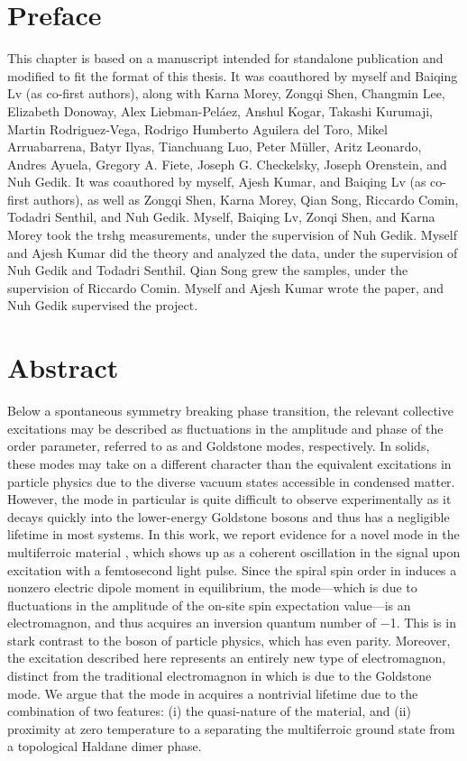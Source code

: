 \section{Preface}

This chapter is based on a manuscript intended for standalone publication and modified to fit the format of this thesis.
It was coauthored by myself and Baiqing Lv (as co-first authors), along with Karna Morey, Zongqi Shen, Changmin Lee, Elizabeth Donoway, Alex Liebman-Pel\'{a}ez, Anshul Kogar, Takashi Kurumaji, Martin Rodriguez-Vega, Rodrigo Humberto Aguilera del Toro, Mikel Arruabarrena, Batyr Ilyas, Tianchuang Luo, Peter M\"{u}ller, Aritz Leonardo, Andres Ayuela, Gregory A. Fiete, Joseph G. Checkelsky, Joseph Orenstein, and Nuh Gedik.
It was coauthored by myself, Ajesh Kumar, and Baiqing Lv (as co-first authors), as well as Zongqi Shen, Karna Morey, Qian Song, Riccardo Comin, Todadri Senthil, and Nuh Gedik.
Myself, Baiqing Lv, Zonqi Shen, and Karna Morey took the \gls{trshg} measurements, under the supervision of Nuh Gedik.
Myself and Ajesh Kumar did the theory and analyzed the data, under the supervision of Nuh Gedik and Todadri Senthil.
Qian Song grew the samples, under the supervision of Riccardo Comin.
Myself and Ajesh Kumar wrote the paper, and Nuh Gedik supervised the project.

\section{Abstract}
Below a spontaneous symmetry breaking phase transition, the relevant collective excitations may be described as fluctuations in the amplitude and phase of the order parameter, referred to as \higgs and Goldstone modes, respectively.
In solids, these modes may take on a different character than the equivalent excitations in particle physics due to the diverse vacuum states accessible in condensed matter.
However, the \higgs mode in particular is quite difficult to observe experimentally as it decays quickly into the lower-energy Goldstone bosons and thus has a negligible lifetime in most systems.
In this work, we report evidence for a novel \higgs mode in the multiferroic material , which shows up as a coherent oscillation in the  signal upon excitation with a femtosecond light pulse.
Since the spiral spin order in  induces a nonzero electric dipole moment in equilibrium, the \higgs mode---which is due to fluctuations in the amplitude of the on-site spin expectation value---is an electromagnon, and thus acquires an inversion quantum number of \num{-1}. 
This is in stark contrast to the \higgs boson of particle physics, which has even parity.
Moreover, the excitation described here represents an entirely new type of electromagnon, distinct from the traditional electromagnon in  which is due to the Goldstone mode.
We argue that the \higgs mode in  acquires a nontrivial lifetime due to the combination of two features: (i) the quasi-\oned nature of the material, and (ii) proximity at zero temperature to a  separating the multiferroic ground state from a topological Haldane dimer phase.

